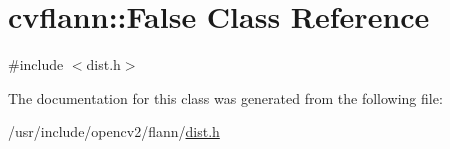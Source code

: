 \hypertarget{classcvflann_1_1False}{\section{cvflann\-:\-:False Class Reference}
\label{classcvflann_1_1False}
}


{\ttfamily \#include $<$dist.\-h$>$}



The documentation for this class was generated from the following file\-:\begin{DoxyCompactItemize}
\item 
/usr/include/opencv2/flann/\hyperlink{dist_8h}{dist.\-h}\end{DoxyCompactItemize}
